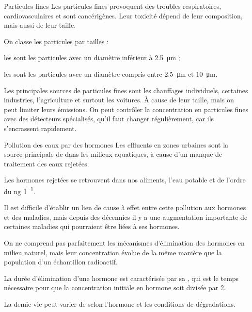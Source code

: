 \begin{doc}{Particules fines}
  Les particules fines provoquent des troubles respiratoires, cardiovasculaires et sont cancérigènes.
  Leur toxicité dépend de leur composition, mais aussi de leur taille. 

  \begin{importants}
    On classe les particules par tailles :
    \begin{listePoints}
      \item les  sont les particules avec un diamètre inférieur à \qty{2,5}{\micro\m} ;
      \item les  sont les particules avec un diamètre compris entre \qty{2,5}{\micro\m} et \qty{10}{\micro\m}.
    \end{listePoints}
  \end{importants}

  Les principales sources de particules fines sont les chauffages individuels, certaines industries, l'agriculture et surtout les voitures.
  À cause de leur taille,  mais on peut limiter leurs émissions.
  On peut contrôler la concentration en particules fines avec des détecteurs spécialisés, qu'il faut changer régulièrement, car ils s'encrassent rapidement.
\end{doc}

\begin{doc}{Pollution des eaux par des hormones}
  Les effluents en zones urbaines sont la source principale de  dans les milieux aquatiques, à cause d'un manque de traitement des eaux rejetées.

  \begin{importants}
    Les hormones rejetées se retrouvent dans nos aliments, l'eau potable et  de l'ordre du \unit{\nano\g\per\litre}.
  \end{importants}
  Il est difficile d'établir un lien de cause à effet entre cette pollution aux hormones et des maladies, mais depuis des décennies il y a une augmentation importante de certaines maladies qui pourraient être liées à ses hormones.

  On ne comprend pas parfaitement les mécanismes d'élimination des hormones en milieu naturel, mais leur concentration évolue de la même manière que la population d'un échantillon radioactif.
  \begin{importants}
    La durée d'élimination d'une hormone est caractérisée par sa , qui est le temps nécessaire pour que la concentration initiale en hormone soit divisée par 2.
  \end{importants}
  
  La demie-vie peut varier de  selon l'hormone et les conditions de dégradations.
\end{doc}

